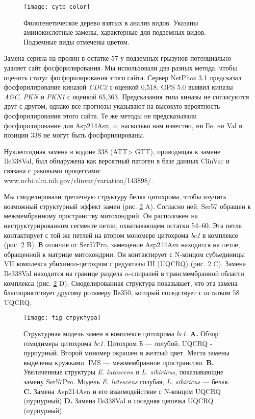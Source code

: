 \begin{figure}[h!]
	\begin{center}
		\texttt{[image: cytb\_color]}
	\end{center}
	\caption{Филогенетическое дерево взятых в анализ видов. Указаны аминокислотные замены, характерные для подземных видов. Подземные виды отмечены цветом.}
	\label{PhyloTree}
\end{figure}

Замена серина на пролин в остатке 57 у подземных грызунов потенциально удаляет сайт фосфорилирования. Мы использовали два разных метода, чтобы оценить статус фосфорилирования этого сайта. Сервер NetPhos 3.1 предсказал фосфорилирование киназой \textit{CDC2} с оценкой 0,518. GPS 5.0 выявил киназы \textit{AGC}, \textit{PKN} и \textit{PKN1} с оценкой 65,363. Предсказания типа киназы не согласуются друг с другом, однако все прогнозы указывают на высокую вероятность фосфорилирования этого сайта. Те же методы не предсказывали фосфорилирование для Asp214Asn, и, насколько нам известно, ни Ile, ни Val в позиции 338 не могут быть фосфорилированы.

Нуклеотидная замена в кодоне 338 (ATT> GTT), приводящая к замене Ile338Val, был обнаружена как вероятный патоген в базе данных ClinVar и связана с раковыми процессами: www.ncbi.nlm.nih.gov/clinvar/variation/143898/.

Мы смоделировали третичную структуру белка цитохрома, чтобы изучить возможный структурный эффект замен (рис. \ref{CytStructure} A). Согласно ней, Ser57 обращен к межмембранному пространству митохондрий. Он расположен на неструктурированном сегменте петли, охватывающем остатки 54–60. Эта петля контактирует с той же петлей на втором мономере цитохрома \textit{bc1} в комплексе (рис. \ref{CytStructure} B). В отличие от Ser57Pro, замещение Asp214Asn находится на петле, обращенной к матрице митохондрии. Он контактирует с N-концом субъединицы VII комплекса убихинол-цитохром с редуктазы III (UQCRQ) (рис. \ref{CytStructure} C). Замена Ile338Val находится на границе раздела $\alpha$-спиралей в трансмембранной области комплекса (рис. \ref{CytStructure} D). Смоделированная структура показывает, что эта замена благоприятствует другому ротамеру Ile350, который соседствует с остатком 58 UQCRQ.

\begin{figure}[h!]
	\begin{center}
		\texttt{[image: fig структура]}
	\end{center}
	\caption{Структурная модель замен в комплексе цитохрома \textit{bc1}. \textbf{A.} Обзор гомодимера цитохрома \textit{bc1}. Цитохром Б --- голубой, UQCRQ - пурпурный. Второй мономер окрашен в желтый цвет. Места замены выделены кружками. IMS --- межмембранное пространство. \textbf{B.} Увеличенные структуры \textit{E. lutescens} и \textit{L. sibiricus}, показывающие замену Ser57Pro. Модель \textit{E. lutescens} голубая, \textit{L. sibiricus} --- белая. \textbf{C.} Замена Asp214Asn и его взаимодействие с N-концом UQCRQ (пурпурный) \textbf{D.} Замена Ile338Val и соседняя цепочка UQCRQ (пурпурный)}
	\label{CytStructure}
\end{figure}

